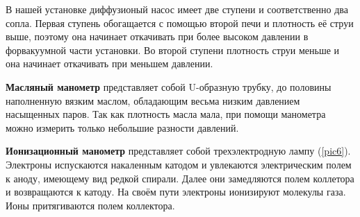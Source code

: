 \documentclass{article}
\newcommand{\bb}{\textbf}
\begin{document}
\begin{figure}[!h]
    \centering
    \hfill
\end{figure}

В нашей установке диффузионый насос имеет две ступени и соответственно два сопла. Первая ступень обогащается с помощью второй печи и плотность её струи выше, поэтому она начинает откачивать при более высоком давлении в форвакуумной части установки. Во второй ступени плотность струи меньше и она начинает откачивать при меньшем давлении.

\bb{Масляный манометр} представляет собой U-образную трубку, до половины наполненную вязким маслом, обладающим весьма низким давлением насыщенных паров. Так как плотность масла мала, при помощи манометра можно измерить только небольшие разности давлений.

\bb{Ионизационный манометр} представляет собой трехэлектродную лампу (\ref{pic6}). Электроны испускаются накаленным катодом и увлекаются электрическим полем к аноду, имеющему вид редкой спирали. Далее они замедляются полем коллетора и возвращаются к катоду. На своём пути электроны ионизируют молекулы газа. Ионы притягиваются полем коллектора.
\end{document}
